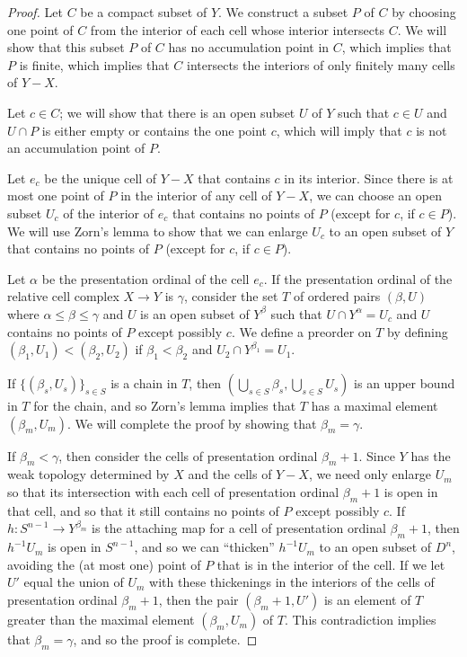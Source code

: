 \documentclass[12pt]{amsart}
\numberwithin{equation}{section}
\theoremstyle{slplain}
\theoremstyle{definition}
\theoremstyle{remark}
\begin{document}
\begin{proof}
  Let $C$ be a compact subset of $Y$.  We construct a subset $P$ of
  $C$ by choosing one point of $C$ from the interior of each cell
  whose interior intersects $C$.  We will show that this subset $P$ of
  $C$ has no accumulation point in $C$, which implies that $P$ is
  finite, which implies that $C$ intersects the interiors of only
  finitely many cells of $Y-X$.

  Let $c \in C$; we will show that there is an open subset $U$ of $Y$
  such that $c\in U$ and $U\cap P$ is either empty or contains the one
  point $c$, which will imply that $c$ is not an accumulation point of
  $P$.
  
  Let $e_{c}$ be the unique cell of $Y-X$ that contains $c$ in its
  interior.  Since there is at most one point of $P$ in the interior
  of any cell of $Y-X$, we can choose an open subset $U_{c}$ of the
  interior of $e_{c}$ that contains no points of $P$ (except for $c$,
  if $c \in P$). We will use Zorn's lemma to show that we can enlarge
  $U_{c}$ to an open subset of $Y$ that contains no points of $P$
  (except for $c$, if $c \in P$).
  
  Let $\alpha$ be the presentation ordinal of the cell $e_{c}$.  If
  the presentation ordinal of the relative cell complex $X \to Y$ is
  $\gamma$, consider the set $T$ of ordered pairs $(\beta, U)$ where
  $\alpha \le \beta \le \gamma$ and $U$ is an open subset of $Y^\beta$
  such that $U\cap Y^\alpha = U_{c}$ and $U$ contains no points of $P$
  except possibly $c$.  We define a preorder on $T$ by defining
  $(\beta_1, U_1) < (\beta_2, U_2)$ if $\beta_1 < \beta_2$ and
  $U_2\cap Y^{\beta_1} = U_1$.

  If $\{(\beta_s, U_s)\}_{s\in S}$ is a chain in $T$, then
  $(\bigcup_{s\in S} \beta_s, \bigcup_{s\in S}U_s)$ is an upper bound in
  $T$ for the chain, and so Zorn's lemma implies that $T$ has a
  maximal element $(\beta_m, U_m)$.  We will complete the proof by
  showing that $\beta_m = \gamma$.
  
  If $\beta_m < \gamma$, then consider the cells of presentation
  ordinal $\beta_m + 1$.  Since $Y$ has the weak topology determined
  by $X$ and the cells of $Y-X$, we need only enlarge $U_m$ so that
  its intersection with each cell of presentation ordinal $\beta_m +
  1$ is open in that cell, and so that it still contains no points of
  $P$ except possibly $c$.  If $h\colon S^{n-1} \to Y^{\beta_m}$ is
  the attaching map for a cell of presentation ordinal $\beta_m + 1$,
  then $h^{-1}U_m$ is open in $S^{n-1}$, and so we can ``thicken''
  $h^{-1}U_m$ to an open subset of $D^n$, avoiding the (at most one)
  point of $P$ that is in the interior of the cell.  If we let $U'$
  equal the union of $U_m$ with these thickenings in the interiors of
  the cells of presentation ordinal $\beta_m + 1$, then the pair
  $(\beta_m + 1, U')$ is an element of $T$ greater than the maximal
  element $(\beta_m,U_m)$ of $T$.  This contradiction implies that
  $\beta_m = \gamma$, and so the proof is complete.
\end{proof}
\end{document}
